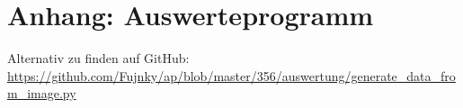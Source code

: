 \appendix
\section{Anhang: Auswerteprogramm}
\label{sec:prog}
Alternativ zu finden auf GitHub: \url{https://github.com/Fujnky/ap/blob/master/356/auswertung/generate_data_from_image.py}

